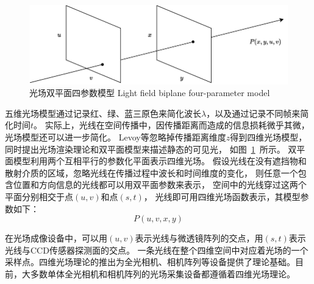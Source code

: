 

\begin{figure}[b]
	\centering
	\includegraphics[width=0.95\linewidth]{figures/chapter2/double_plane_model.drawio}
	\bicaption
	{光场双平面四参数模型}
	{Light field biplane four-parameter model}  
	\label{chapter2_fig1:double_plane}
\end{figure}


五维光场模型通过记录红、绿、蓝三原色来简化波长$\lambda$，以及通过记录不同帧来简化时间$t$。
实际上，光线在空间传播中，因传播距离而造成的信息损耗微乎其微，光场模型还可以进一步简化。
Levoy等忽略掉传播距离维度$z$得到四维光场模型，
同时提出光场渲染理论和双平面模型来描述静态的可见光，
如图~\ref{chapter2_fig1:double_plane}~所示。
双平面模型利用两个互相平行的参数化平面表示四维光场。
假设光线在没有遮挡物和散射介质的区域，忽略光线在传播过程中波长和时间维度的变化，
则任意一个包含位置和方向信息的光线都可以用双平面参数来表示，
空间中的光线穿过这两个平面分别相交于点$(u, v)$和点$(s, t)$，
光线即可用四维光场函数表示，其模型参数如下：
\begin{equation}
	P(u, v, x, y)
\end{equation}






在光场成像设备中，可以用$(u, v)$表示光线与微透镜阵列的交点，用$(s, t)$表示光线与CCD传感器探测面的交点。
一条光线在整个四维空间中对应着光场的一个采样点。四维光场理论的推出为全光相机、相机阵列等设备提供了理论基础。目前，大多数单体全光相机和相机阵列的光场采集设备都遵循着四维光场理论。
%
%




